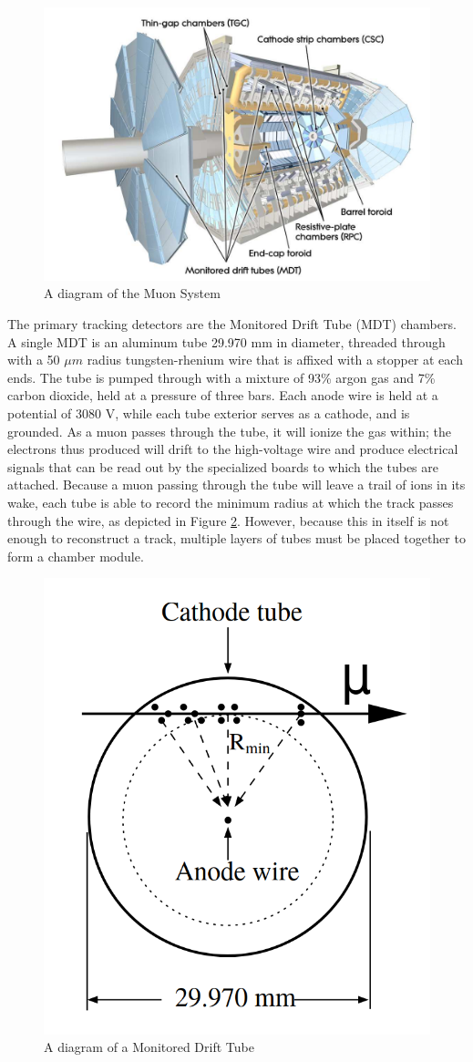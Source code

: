 \begin{figure}
  \includegraphics[width=\linewidth]{figures/detector_chapter/MuSyst.png}
  \caption{A diagram of the Muon System \cite{ATLAS_Jinst}}
  \label{fig:MuSyst}
\end{figure}

The primary tracking detectors are the Monitored Drift Tube (MDT) chambers. A single MDT is an aluminum tube 29.970 mm in diameter, threaded through with a 50 $\mu m$ radius tungsten-rhenium wire that is affixed with a stopper at each ends. The tube is pumped through with a mixture of 93\% argon gas and 7\% carbon dioxide, held at a pressure of three bars. Each anode wire is held at a potential of 3080 V, while each tube exterior serves as a cathode, and is grounded. As a muon passes through the tube, it will ionize the gas within; the electrons thus produced will drift to the high-voltage wire and produce electrical signals that can be read out by the specialized boards to which the tubes are attached. Because a muon passing through the tube will leave a trail of ions in its wake, each tube is able to record the minimum radius at which the track passes through the wire, as depicted in Figure \ref{fig:MDT}. However, because this in itself is not enough to reconstruct a track, multiple layers of tubes must be placed together to form a chamber module.

\begin{figure}
  \centering
  \includegraphics[width=0.5\linewidth]{figures/detector_chapter/MDT.png}
  \caption{A diagram of a Monitored Drift Tube \cite{ATLAS_Jinst}}
  \label{fig:MDT}
\end{figure}

